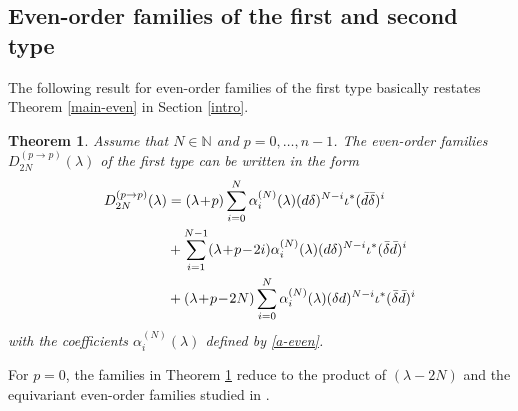 \documentclass[a4paper,12pt,reqno]{amsart}
\newtheorem{theorem}{Theorem}
\numberwithin{theorem}{subsection}
\numberwithin{equation}{section}
\begin{document}
\subsection{Even-order families of the first and second type}\label{case-even}

The following result for even-order families of the first type basically
restates Theorem \ref{main-even} in Section \ref{intro}.

\begin{theorem}\label{coeffeven} Assume that $N \in {\mathbb{N}}$ and $p=0,\dots,n-1$.
The even-order families $D_{2N}^{(p \to p)}(\lambda)$ of the first type can be
written in the form
\begin{align}\label{SBO-even}
   D_{2N}^{(p \to p)}(\lambda)
   & = (\lambda\!+\!p) \sum_{i=0}^N \alpha_i^{(N)}(\lambda)
   ({d}\delta)^{N-i} \iota^* (\bar{d} \bar{\delta})^i \notag \\
   & + \sum_{i=1}^{N-1} (\lambda\!+\!p\!-\!2i) \alpha_i^{(N)}(\lambda)
   ({d} \delta)^{N-i} \iota^* (\bar{\delta} \bar{d})^i \notag \\
   & + (\lambda\!+\!p\!-\!2N) \sum_{i=0}^N \alpha_i^{(N)}(\lambda)
   (\delta {d})^{N-i} \iota^*(\bar{\delta} \bar{d})^i
\end{align}
with the coefficients $\alpha_i^{(N)}(\lambda)$ defined by \eqref{a-even}.
\end{theorem}

For $p=0$, the families in Theorem \ref{coeffeven} reduce to the product of
$(\lambda-2N)$ and the equivariant even-order families studied in \cite{Juhl}.
\end{document}
